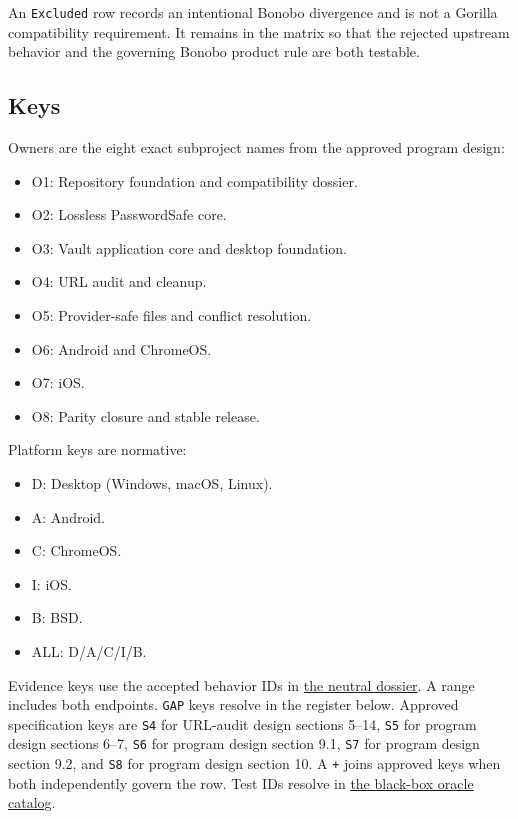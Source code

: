 \documentclass[
  letterpaper,
]{article}
\newcommand{\passthrough}[1]{#1}
\providecommand{\tightlist}{%
  \setlength{\itemsep}{0pt}\setlength{\parskip}{0pt}}
\begin{document}
An \passthrough{\lstinline!Excluded!} row records an intentional Bonobo divergence and is not a Gorilla compatibility
requirement. It remains in the matrix so that the rejected upstream behavior and the governing Bonobo product rule are
both testable.

\subsection{Keys}\label{keys}

Owners are the eight exact subproject names from the approved program design:

\begin{itemize}
\tightlist
\item
  O1: Repository foundation and compatibility dossier.
\item
  O2: Lossless PasswordSafe core.
\item
  O3: Vault application core and desktop foundation.
\item
  O4: URL audit and cleanup.
\item
  O5: Provider-safe files and conflict resolution.
\item
  O6: Android and ChromeOS.
\item
  O7: iOS.
\item
  O8: Parity closure and stable release.
\end{itemize}

Platform keys are normative:

\begin{itemize}
\tightlist
\item
  D: Desktop (Windows, macOS, Linux).
\item
  A: Android.
\item
  C: ChromeOS.
\item
  I: iOS.
\item
  B: BSD.
\item
  ALL: D/A/C/I/B.
\end{itemize}

Evidence keys use the accepted behavior IDs in \href{./behavior-dossier.md}{the neutral dossier}. A range includes both
endpoints. \passthrough{\lstinline!GAP!} keys resolve in the register below. Approved specification keys are
\passthrough{\lstinline!S4!} for URL-audit design sections 5--14, \passthrough{\lstinline!S5!} for program design
sections 6--7, \passthrough{\lstinline!S6!} for program design section 9.1, \passthrough{\lstinline!S7!} for program
design section 9.2, and \passthrough{\lstinline!S8!} for program design section 10. A \passthrough{\lstinline!+!} joins
approved keys when both independently govern the row. Test IDs resolve in \href{./test-oracles.md}{the black-box oracle
catalog}.
\end{document}
